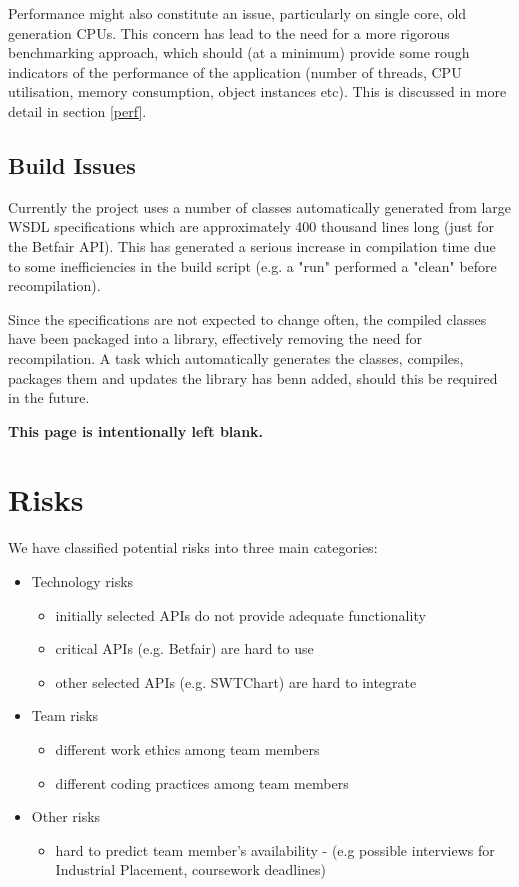 \documentclass[10pt]{report}
\begin{document}
Performance might also constitute an issue, particularly on single core, old generation CPUs. This concern has lead to the need for a more rigorous benchmarking approach, which should (at a minimum) provide some rough indicators of the performance of the application (number of threads, CPU utilisation, memory consumption, object instances etc). This is discussed in more detail in section \ref{perf}.

\subsection{Build Issues}

Currently the project uses a number of classes automatically generated from large WSDL specifications which are approximately 400 thousand lines long (just for the Betfair API).
This has generated a serious increase in compilation time due to some inefficiencies in the build script (e.g. a "run" performed a "clean" before recompilation).

Since the specifications are not expected to change often, the compiled classes have been packaged into a library, effectively removing the need for recompilation.
A task which automatically generates the classes, compiles, packages them and updates the library has benn added, should this be required in the future.

\pagebreak
{\bf This page is intentionally left blank.}
\pagebreak

\section{Risks}

We have classified potential risks into three main categories:
\begin{itemize}
	\item Technology risks
	\begin{itemize}
		\item initially selected APIs do not provide adequate functionality
		\item critical APIs (e.g. Betfair) are hard to use
		\item other selected APIs (e.g. SWTChart) are hard to integrate
	\end{itemize}

	\item Team risks
		\begin{itemize}
		\item different work ethics among team members
		\item different coding practices among team members
	\end{itemize}

	\item Other risks
		\begin{itemize}
		\item hard to predict team member's availability - (e.g possible interviews for Industrial Placement, coursework deadlines)
	\end{itemize}

\end{itemize}
\end{document}

